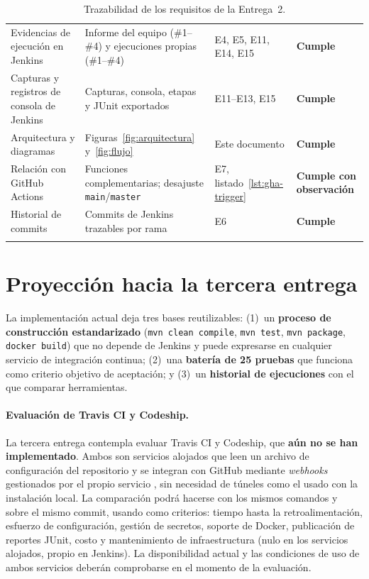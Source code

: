 \documentclass[11pt,a4paper]{article}
\newcommand{\ok}{\textcolor{ok}{\textbf{Cumple}}}
\newcommand{\parcial}{\textcolor{warn}{\textbf{Cumple con observación}}}
\begin{document}
\begin{longtable}{@{}P{3.4cm} P{4.6cm} P{3.6cm} P{2.7cm}@{}}
Evidencias de ejecución en Jenkins & Informe del equipo (\#1--\#4) y ejecuciones propias (\#1--\#4) & E4, E5, E11, E14, E15 &
\ok\\
Capturas y registros de consola de Jenkins & Capturas, consola, etapas y JUnit exportados & E11--E13, E15 & \ok\\
Arquitectura y diagramas & Figuras~\ref{fig:arquitectura} y~\ref{fig:flujo} & Este documento & \ok\\
Relación con GitHub Actions & Funciones complementarias; desajuste \texttt{main}/\texttt{master} &
E7, listado~\ref{lst:gha-trigger} & \parcial{}\\
Historial de commits & Commits de Jenkins trazables por rama & E6 & \ok\\
\bottomrule
\caption{Trazabilidad de los requisitos de la Entrega~2.}
\label{tab:cumplimiento2}
\end{longtable}

\section{Proyección hacia la tercera entrega}
\label{sec:proyeccion}

La implementación actual deja tres bases reutilizables: (1)~un \textbf{proceso de construcción
estandarizado} (\texttt{mvn clean compile}, \texttt{mvn test}, \texttt{mvn package},
\texttt{docker build}) que no depende de Jenkins y puede expresarse en cualquier servicio de
integración continua; (2)~una \textbf{batería de 25 pruebas} que funciona como criterio objetivo de
aceptación; y (3)~un \textbf{historial de ejecuciones} con el que comparar herramientas.

\paragraph{Evaluación de Travis CI y Codeship.} La tercera entrega contempla evaluar Travis CI y
Codeship, que \textbf{aún no se han implementado}. Ambos son servicios alojados que leen un archivo de
configuración del repositorio y se integran con GitHub mediante \emph{webhooks} gestionados por el
propio servicio \cite{travis-docs}, sin necesidad de túneles como el usado con la instalación
local. La comparación podrá hacerse con los mismos comandos y sobre el mismo commit,
usando como criterios: tiempo hasta la retroalimentación, esfuerzo de configuración, gestión de
secretos, soporte de Docker, publicación de reportes JUnit, costo y mantenimiento de
infraestructura (nulo en los servicios alojados, propio en Jenkins). La disponibilidad actual y las
condiciones de uso de ambos servicios deberán comprobarse en el momento de la evaluación.
\end{document}

